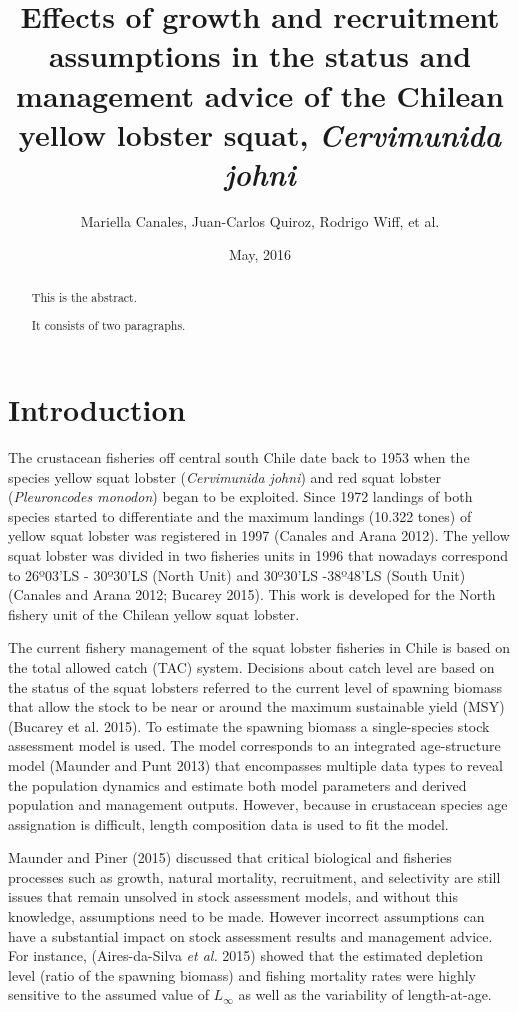 \documentclass[11pt,letterpaper,]{article}
\title{Effects of growth and recruitment assumptions in the status and
management advice of the Chilean yellow lobster squat, \emph{Cervimunida
johni}}
\subtitle{\begin{center}\rule{0.5\linewidth}{\linethickness}\end{center}}
\author{Mariella Canales, Juan-Carlos Quiroz, Rodrigo Wiff, et al.}
\date{May, 2016}
\begin{document}
\maketitle
\begin{abstract}
This is the abstract.

It consists of two paragraphs.
\end{abstract}

\section{Introduction}\label{introduction}

The crustacean fisheries off central south Chile date back to 1953 when
the species yellow squat lobster (\emph{Cervimunida johni}) and red
squat lobster (\emph{Pleuroncodes monodon}) began to be exploited. Since
1972 landings of both species started to differentiate and the maximum
landings (10.322 tones) of yellow squat lobster was registered in 1997
(Canales and Arana 2012). The yellow squat lobster was divided in two
fisheries units in 1996 that nowadays correspond to 26º03'LS - 30º30'LS
(North Unit) and 30º30'LS -38º48'LS (South Unit) (Canales and Arana
2012; Bucarey 2015). This work is developed for the North fishery unit
of the Chilean yellow squat lobster.

The current fishery management of the squat lobster fisheries in Chile
is based on the total allowed catch (TAC) system. Decisions about catch
level are based on the status of the squat lobsters referred to the
current level of spawning biomass that allow the stock to be near or
around the maximum sustainable yield (MSY) (Bucarey et al. 2015). To
estimate the spawning biomass a single-species stock assessment model is
used. The model corresponds to an integrated age-structure model
(Maunder and Punt 2013) that encompasses multiple data types to reveal
the population dynamics and estimate both model parameters and derived
population and management outputs. However, because in crustacean
species age assignation is difficult, length composition data is used to
fit the model.

Maunder and Piner (2015) discussed that critical biological and
fisheries processes such as growth, natural mortality, recruitment, and
selectivity are still issues that remain unsolved in stock assessment
models, and without this knowledge, assumptions need to be made. However
incorrect assumptions can have a substantial impact on stock assessment
results and management advice. For instance, (Aires-da-Silva \emph{et
al.} 2015) showed that the estimated depletion level (ratio of the
spawning biomass) and fishing mortality rates were highly sensitive to
the assumed value of \(L_{\infty}\) as well as the variability of
length-at-age.
\end{document}
